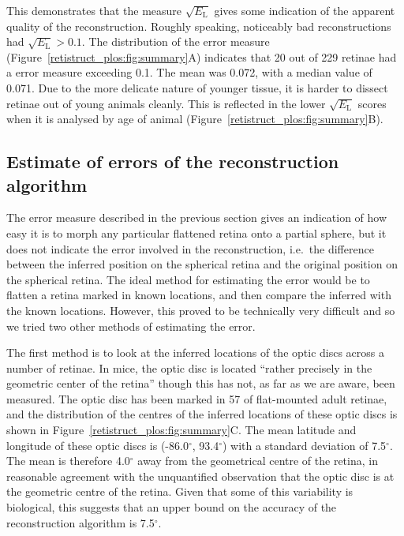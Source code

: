 \documentclass[10pt]{article}
\begin{document}
This demonstrates that the measure $\sqrt{E_\mathrm{L}}$ gives some
indication of the apparent quality of the reconstruction. Roughly
speaking, noticeably bad reconstructions had
$\sqrt{E_\mathrm{L}}>0.1$. The distribution of the error measure
(Figure~\ref{retistruct_plos:fig:summary}A) indicates that 20 out of
229 retinae had a error measure exceeding 0.1. The mean was 0.072,
with a median value of 0.071. Due to the more delicate nature of
younger tissue, it is harder to dissect retinae out of young animals
cleanly. This is reflected in the lower $\sqrt{E_\mathrm{L}}$ scores
when it is analysed by age of animal
(Figure~\ref{retistruct_plos:fig:summary}B).

\subsection*{Estimate of errors of the reconstruction algorithm}

The error measure described in the previous section gives an
indication of how easy it is to morph any particular flattened retina
onto a partial sphere, but it does not indicate the error involved in
the reconstruction, i.e.\ the difference between the inferred
position on the spherical retina and the original position on the
spherical retina. The ideal method for estimating the error would be
to flatten a retina marked in known locations, and then compare the
inferred with the known locations. However, this proved to be
technically very difficult and so we tried two other methods of
estimating the error.

The first method is to look at the inferred locations of the optic
discs across a number of retinae. In mice, the optic disc is located
``rather precisely in the geometric center of the retina''
\cite{DragOlse81gang} though this has not, as far as we are aware,
been measured. The optic disc has been marked in 57 of flat-mounted
adult retinae, and the distribution of the centres of the inferred
locations of these optic discs is shown in
Figure~\ref{retistruct_plos:fig:summary}C. The mean latitude and
longitude of these optic discs is (-86.0$^\circ$, 93.4$^\circ$) with a
standard deviation of 7.5$^\circ$. The mean is therefore 4.0$^\circ$
away from the geometrical centre of the retina, in reasonable
agreement with the unquantified observation that the optic disc is at
the geometric centre of the retina.  Given that some of this
variability is biological, this suggests that an upper bound on the
accuracy of the reconstruction algorithm is 7.5$^\circ$.
\end{document}
